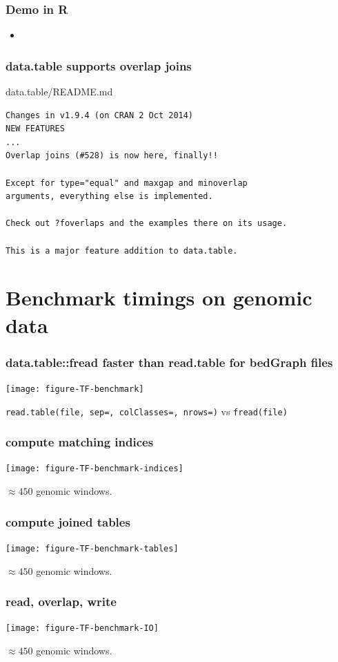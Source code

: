 \documentclass{beamer}
\begin{document}
\begin{frame}
  \frametitle{Demo in R}
  
  \begin{itemize}
  \item {}
  \end{itemize}
\end{frame}

\begin{frame}[fragile]
  \frametitle{data.table supports overlap joins}

data.table/README.md

\begin{verbatim}
Changes in v1.9.4 (on CRAN 2 Oct 2014)
NEW FEATURES
...
Overlap joins (#528) is now here, finally!! 

Except for type="equal" and maxgap and minoverlap 
arguments, everything else is implemented. 

Check out ?foverlaps and the examples there on its usage. 

This is a major feature addition to data.table.
\end{verbatim}

\end{frame}



\section{Benchmark timings on genomic data}

\begin{frame}
  \frametitle{data.table::fread faster than read.table for bedGraph
    files}
  \texttt{[image: figure-TF-benchmark]}

  \texttt{read.table(file, sep=, colClasses=, nrows=)} vs
  \texttt{fread(file)}
\end{frame}

\begin{frame}
  \frametitle{compute matching indices}
  \texttt{[image: figure-TF-benchmark-indices]}

  $\approx 450$ genomic windows.
\end{frame}

\begin{frame}
  \frametitle{compute joined tables}
  \texttt{[image: figure-TF-benchmark-tables]}

  $\approx 450$ genomic windows.
\end{frame}

\begin{frame}
  \frametitle{read, overlap, write}
  \texttt{[image: figure-TF-benchmark-IO]}

  $\approx 450$ genomic windows.
\end{frame}
\end{document}
